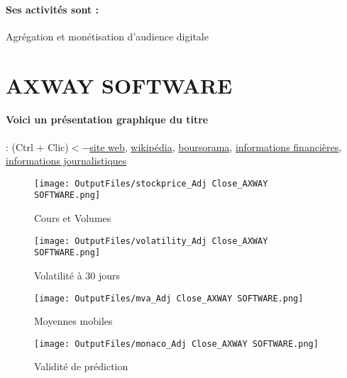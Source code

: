 \documentclass[11pt,a4paper]{report}%
\begin{document}
\paragraph{Ses activités sont : } Agrégation et monétisation d’audience digitale 
    
    \newpage

\section{AXWAY SOFTWARE}

\paragraph{Voici un présentation graphique du titre} : (Ctrl + Clic)$<-$\href{https://investors.axway.com/fr}{site web}, \href{https://fr.wikipedia.org/wiki/Axway}{wikipédia}, \href{https://www.boursorama.com/cours/1rPAXW}{boursorama}, \href{https://www.qwant.com/?q=site:https:%2f%2fwww.easybourse.com%2faction-societe%2fAXWAY-SOFTWARE&t=web&client=ext-firefox-hp}{informations financières}, \href{https://bourse.lerevenu.com/cours-de-bourse/fiche-valeur-synthese/AXWAY-SOFTWARE/AXW-FR}{informations journalistiques}
\begin{figure}[!htb]
   \begin{minipage}{0.5\textwidth}
     \centering
     \texttt{[image: OutputFiles/stockprice\_Adj Close\_AXWAY SOFTWARE.png]}
     \caption{Cours et Volumes}\label{Fig:price_AXWAY SOFTWARE}
   \end{minipage}\hfill
   \begin{minipage}{0.5\textwidth}
     \centering
     \texttt{[image: OutputFiles/volatility\_Adj Close\_AXWAY SOFTWARE.png]}
     \caption{Volatilité à 30 jours}\label{Fig:volat_AXWAY SOFTWARE}
   \end{minipage}
\end{figure}
\begin{figure}[!htb]
   \begin{minipage}{0.5\textwidth}
     \centering
     \texttt{[image: OutputFiles/mva\_Adj Close\_AXWAY SOFTWARE.png]}
     \caption{Moyennes mobiles}\label{Fig:mva_AXWAY SOFTWARE}
   \end{minipage}\hfill
   \begin{minipage}{0.5\textwidth}
     \centering
     \texttt{[image: OutputFiles/monaco\_Adj Close\_AXWAY SOFTWARE.png]}
     \caption{Validité de prédiction}\label{Fig:prediction_AXWAY SOFTWARE}
   \end{minipage}
\end{figure}
\end{document}
